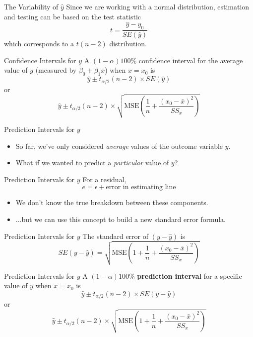 \begin{frame}{The Variability of $\hat{y}$}
    Since we are working with a normal distribution, estimation and testing can be based on the test statistic
    \[
        t = \frac{\hat{y} - y_0}{SE(\hat{y})}
    \]
    which corresponds to a $t(n-2)$ distribution.
\end{frame}

\begin{frame}{Confidence Intervals for $y$}
    A $(1-\alpha)100$\% confidence interval for the average value of $y$ (measured by $\beta_0 + \beta_1 x$) when $x=x_0$ is
    \[
        \hat{y} \pm t_{\alpha/2}(n-2)\times SE(\hat{y}) 
    \]
    or
    \[
        \hat{y} \pm t_{\alpha/2}(n-2)\times 
        \sqrt{\text{MSE}\left(\frac{1}{n} + \frac{(x_0-\bar{x})^2}{SS_x}\right)}
    \]
\end{frame}

\begin{frame}{Prediction Intervals for $y$}
    \begin{itemize}
        \item So far, we've only considered \textit{average} values of the outcome variable $y$.
        \item What if we wanted to predict a \textit{particular} value of $y$?
    \end{itemize}
\end{frame}

\begin{frame}{Prediction Intervals for $y$}
    For a residual,
    \[
        e = \epsilon + \text{error in estimating line}
    \]
    \begin{itemize}
        \item We don't know the true breakdown between these components.
        \item ...but we can use this concept to build a new standard error formula.
    \end{itemize}
\end{frame}

\begin{frame}{Prediction Intervals for $y$}
    The standard error of $(y-\hat{y})$ is
    \[
        SE(y-\hat{y}) = \sqrt{\text{MSE}\left(1 + \frac{1}{n} + \frac{(x_0-\bar{x})^2}{SS_x}\right)}
    \]
\end{frame}

\begin{frame}{Prediction Intervals for $y$}
    A $(1-\alpha)100$\% \textbf{prediction interval} for a specific value of $y$ when $x=x_0$ is
    \[
        \hat{y} \pm t_{\alpha/2}(n-2)\times SE(y-\hat{y}) 
    \]
    or
    \[
        \hat{y} \pm t_{\alpha/2}(n-2)\times 
        \sqrt{\text{MSE}\left(1 + \frac{1}{n} + \frac{(x_0-\bar{x})^2}{SS_x}\right)}
    \]
\end{frame}

